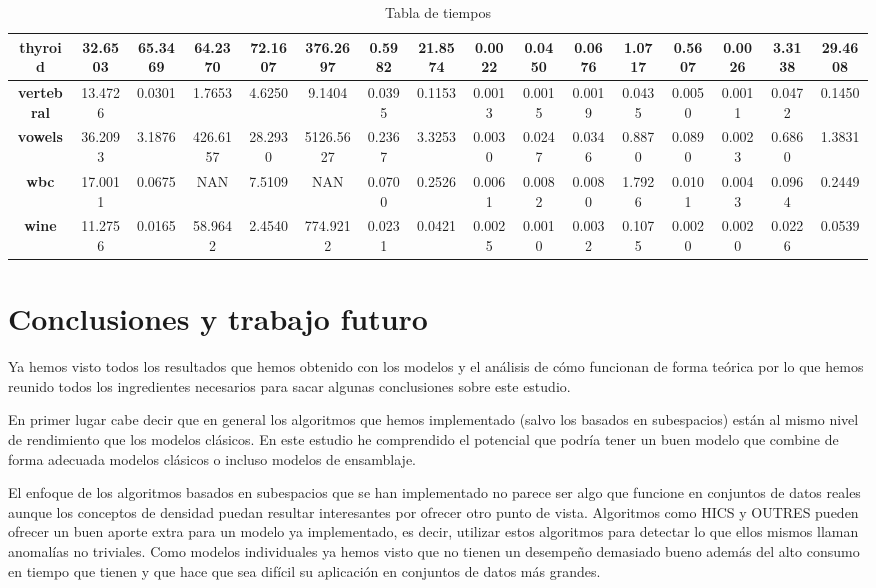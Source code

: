 \begin{table}
{\begin{tabular}{|c|c|c|c|c|c|c|c|c|c|c|c|c|c|c|c|}
		\textbf{thyroid}          & 32.6503      & 65.3469   & 64.2370     & 72.1607  & 376.2697  & 0.5982    & 21.8574  & 0.0022    & 0.0450   & 0.0676   & 1.0717   & 0.5607     & 0.0026   & 3.3138   & 29.4608   \\ \hline
		\textbf{vertebral}        & 13.4726      & 0.0301    & 1.7653      & 4.6250    & 9.1404    & 0.0395    & 0.1153   & 0.0013    & 0.0015   & 0.0019   & 0.0435   & 0.0050     & 0.0011   & 0.0472   & 0.1450    \\ \hline
		\textbf{vowels}           & 36.2093      & 3.1876    & 426.6157    & 28.2930   & 5126.5627 & 0.2367    & 3.3253   & 0.0030    & 0.0247   & 0.0346   & 0.8870   & 0.0890     & 0.0023   & 0.6860   & 1.3831   \\ \hline
		\textbf{wbc}              & 17.0011      & 0.0675    & NAN             & 7.5109    & NAN           & 0.0700    & 0.2526   & 0.0061    & 0.0082   & 0.0080   & 1.7926   & 0.0101     & 0.0043   & 0.0964   & 0.2449    \\ \hline
		\textbf{wine}             & 11.2756      & 0.0165    & 58.9642     & 2.4540    & 774.9212  & 0.0231    & 0.0421   & 0.0025    & 0.0010   & 0.0032   & 0.1075   & 0.0020     & 0.0020   & 0.0226   & 0.0539    \\ \hline
	\end{tabular}
}
\caption{Tabla de tiempos}
\end{table}

\clearpage

\section{Conclusiones y trabajo futuro}

Ya hemos visto todos los resultados que hemos obtenido con los modelos y el análisis de cómo funcionan de forma teórica por lo que hemos reunido todos los ingredientes necesarios para sacar algunas conclusiones sobre este estudio.

En primer lugar cabe decir que en general los algoritmos que hemos implementado (salvo los basados en subespacios) están al mismo nivel de rendimiento que los modelos clásicos. En este estudio he comprendido el potencial que podría tener un buen modelo que combine de forma adecuada modelos clásicos o incluso modelos de ensamblaje.

El enfoque de los algoritmos basados en subespacios que se han implementado no parece ser algo que funcione en conjuntos de datos reales aunque los conceptos de densidad puedan resultar interesantes por ofrecer otro punto de vista. Algoritmos como HICS y OUTRES pueden ofrecer un buen aporte extra para un modelo ya implementado, es decir, utilizar estos algoritmos para detectar lo que ellos mismos llaman anomalías no triviales. Como modelos individuales ya hemos visto que no tienen un desempeño demasiado bueno además del alto consumo en tiempo que tienen y que hace que sea difícil su aplicación en conjuntos de datos más grandes. 


